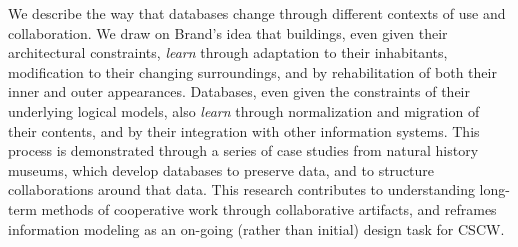 We describe the way that databases change through different contexts of use and collaboration. We draw on Brand's idea that buildings, even given their architectural constraints, \emph{learn} through adaptation to their inhabitants, modification to their changing surroundings, and by rehabilitation of both their inner and outer appearances. Databases, even given the constraints of their underlying logical models, also \emph{learn} through normalization and migration of their contents, and by their integration with other information systems. This process is demonstrated through a series of case studies from natural history museums, which develop databases to preserve data, and to structure collaborations around that data. This research contributes to understanding long-term methods of cooperative work through collaborative artifacts, and reframes information modeling as an on-going (rather than initial) design task for CSCW.